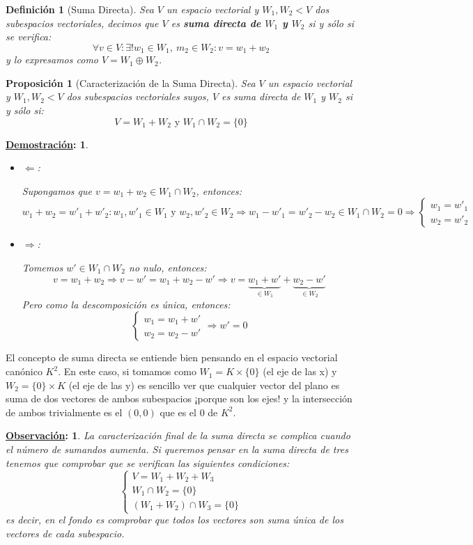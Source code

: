 \documentclass[10pt,a4paper,openright]{book}
\theoremstyle{break}
\newtheorem*{defi}{Definición}
\newtheorem*{prop}{Proposición}
\newtheorem*{demo}{\underline{Demostración}:}
\newtheorem*{obs}{\underline{Observación}:}
\begin{document}
\begin{defi}[Suma Directa]
Sea $V$ un espacio vectorial y $W_1,W_2<V$ dos subespacios vectoriales, decimos que $V$ es \textbf{suma directa de $W_1$ y $W_2$} si y sólo si se verifica:
$$
\forall v\in V: \exists!w_1\in W_1,\ m_2\in W_2: v=w_1+w_2
$$
y lo expresamos como $V = W_1\oplus W_2$.
\end{defi}

\begin{prop}[Caracterización de la Suma Directa]
Sea $V$ un espacio vectorial y $W_1, W_2<V$ dos subespacios vectoriales suyos, $V$ es suma directa de $W_1$ y $W_2$ si y sólo si:
$$
V=W_1+W_2\mbox{ y }  W_1\cap W_2=\{0\}
$$
\end{prop}
\begin{demo}
\begin{itemize}
\item $\Leftarrow$:

Supongamos que $v=w_1+w_2\in W_1\cap W_2$, entonces:
$$
w_1+w_2=w'_1+w'_2: w_1,w'_1\in W_1\mbox{ y } w_2,w'_2\in W_2\Rightarrow w_1-w'_1=w'_2-w_2\in W_1\cap W_2=0\Rightarrow \begin{cases} w_1=w'_1 \\ w_2=w'_2
\end{cases}
$$

\item $\Rightarrow$:

Tomemos $w'\in W_1\cap W_2$ no nulo, entonces:
$$
v = w_1 + w_2 \Rightarrow v-w' = w_1+w_2-w'\Rightarrow v= \underbrace{w_1 + w'}_{\in W_1} + \underbrace{w_2 - w'}_{\in W_2}
$$
Pero como la descomposición es única, entonces:
$$
\begin{cases}
w_1 = w_1 + w' \\ w_2 = w_2 - w'
\end{cases} \Rightarrow w' = 0
$$
\end{itemize}
\end{demo}

El concepto de suma directa se entiende bien pensando en el espacio vectorial canónico $K^2$. En este caso, si tomamos como $W_1=K\times \{0\}$ (el eje de las x) y $W_2=\{0\}\times K$ (el eje de las y) es sencillo ver que cualquier vector del plano es suma de dos vectores de ambos subespacios ¡porque son los ejes! y la intersección de ambos trivialmente es el $(0,0)$ que es el $0$ de $K^2$.

\begin{obs}
La caracterización final de la suma directa se complica cuando el número de sumandos aumenta. Si queremos pensar en la suma directa de tres tenemos que comprobar que se verifican las siguientes condiciones:
$$
\begin{cases}V=W_1+W_2+W_3 \\
W_1\cap W_2=\{0\}\\
(W_1+W_2)\cap W_3=\{0\}\end{cases}
$$
es decir, en el fondo es comprobar que todos los vectores son suma única de los vectores de cada subespacio.
\end{obs}
\end{document}
